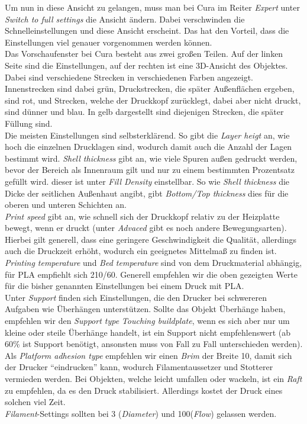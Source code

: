 \documentclass[10pt,a4paper]{scrartcl}
\begin{document}
Um nun in diese Ansicht zu gelangen, muss man bei Cura im Reiter \textit{Expert} unter \textit{Switch to full settings} die Ansicht ändern. Dabei verschwinden die Schnelleinstellungen und diese Ansicht erscheint. Das hat den Vorteil, dass die Einstellungen viel genauer vorgenommen werden können.\\
Das Vorschaufenster bei Cura besteht aus zwei großen Teilen. Auf der linken Seite sind die Einstellungen, auf der rechten ist eine 3D-Ansicht des Objektes. Dabei sind verschiedene Strecken in verschiedenen Farben angezeigt. Innenstrecken sind dabei grün, Druckstrecken, die später Außenflächen ergeben, sind rot, und Strecken, welche der Druckkopf zurücklegt, dabei aber nicht druckt, sind dünner und blau. In gelb dargestellt sind diejenigen Strecken, die später Füllung sind.\\
Die meisten Einstellungen sind selbsterklärend. So gibt die \textit{Layer heigt} an, wie hoch die einzelnen Drucklagen sind, wodurch damit auch die Anzahl der Lagen bestimmt wird. \textit{Shell thickness} gibt an, wie viele Spuren außen gedruckt werden, bevor der Bereich als Innenraum gilt und nur zu einem bestimmten Prozentsatz gefüllt wird. dieser ist unter \textit{Fill Density} einstellbar. So wie \textit{Shell thickness} die Dicke der seitlichen Außenhaut angibt, gibt \textit{Bottom/Top thickness} dies für die oberen und unteren Schichten an.\\
\textit{Print speed} gibt an, wie schnell sich der Druckkopf relativ zu der Heizplatte bewegt, wenn er druckt (unter \textit{Advaced} gibt es noch andere Bewegungsarten). Hierbei gilt generell, dass eine geringere Geschwindigkeit die Qualität, allerdings auch die Druckzeit erhöht, wodurch ein geeignetes Mittelmaß zu finden ist. \textit{Printing temperature} und \textit{Bed temperature} sind von dem Druckmaterial abhängig, für PLA empfiehlt sich 210/60. Generell empfehlen wir die oben gezeigten Werte für die bisher genannten Einstellungen bei einem Druck mit PLA.\\
Unter \textit{Support} finden sich Einstellungen, die den Drucker bei schwereren Aufgaben wie Überhängen unterstützen. Sollte das Objekt Überhänge haben, empfehlen wir den \textit{Support type} \textit{Touching buildplate}, wenn es sich aber nur um kleine oder steile Überhänge handelt, ist ein Support nicht empfehlenswert (ab 60\% ist Support benötigt, ansonsten muss von Fall zu Fall unterschieden werden). Als \textit{Platform adhesion type} empfehlen wir einen \textit{Brim} der Breite 10, damit sich der Drucker \enquote{eindrucken} kann, wodurch Filamentaussetzer und Stotterer vermieden werden. Bei Objekten, welche leicht umfallen oder wackeln, ist ein \textit{Raft} zu empfehlen, da es den Druck stabilisiert. Allerdings kostet der Druck eines solchen viel Zeit.\\
\textit{Filament}-Settings sollten bei 3 (\textit{Diameter}) und 100(\textit{Flow}) gelassen werden.
\pagebreak
\end{document}
